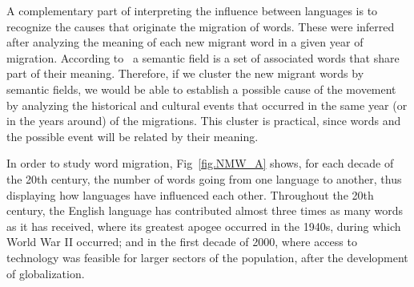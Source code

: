 \documentclass[10pt,letterpaper]{article} %
\begin{document}
A complementary part of interpreting the influence between languages
is to recognize the causes that originate the migration of words.  These were
inferred after analyzing the meaning of each new migrant word in a given year
of migration. According to~\cite{semantic_oxford} a semantic field is a set of
associated words that share part of their meaning. Therefore, if we cluster the
new migrant words  by semantic fields, we would be able to establish a possible
cause of the movement by analyzing the historical and cultural events that
occurred  in the same year (or in the years around) of the migrations. This
cluster is practical, since words  and the possible event will be related by
their meaning. 

% 

In order to study word migration, Fig~\ref{fig.NMW_A} shows, for
each decade of the 20th century, the number of words going from 
one language to another, thus displaying how 
languages have influenced each other. Throughout
the 20th century, the English language has contributed almost three times as
many words as it has received, where its greatest apogee occurred in the
1940s, during which World War II occurred; and in the first decade of 2000,
where access to technology was feasible for larger sectors of the population,
after the development of globalization.

\end{document}
